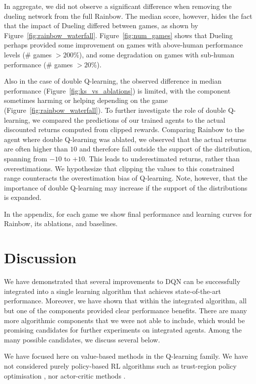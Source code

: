\documentclass[letterpaper]{article} %
\begin{document}
In aggregate, we did not observe a significant difference when removing the dueling network from the full Rainbow. The median score, however, hides the fact that the impact of Dueling differed between games, as shown by Figure~\ref{fig:rainbow_waterfall}. Figure~\ref{fig:num_games} shows that Dueling perhaps provided some improvement on games with above-human performance levels (\# games $> 200\%$), and some degradation on games with sub-human performance (\# games $> 20\%$). 

Also in the case of double Q-learning, the observed difference in median performance (Figure~\ref{fig:ks_vs_ablations}) is limited, with the component sometimes harming or helping depending on the game (Figure~\ref{fig:rainbow_waterfall}). To further investigate the role of double Q-learning, we compared the predictions of our trained agents to the actual discounted returns computed from clipped rewards. Comparing Rainbow to the agent where double Q-learning was ablated, we observed that the actual returns are often higher than $10$ and therefore fall outside the support of the distribution, spanning from $-10$ to $+10$.  This leads to underestimated returns, rather than overestimations.
We hypothesize that clipping the values to this constrained range counteracts the overestimation bias of Q-learning. Note, however, that the importance of double Q-learning may increase if the support of the distributions is expanded.

In the appendix, for each game we show final performance and learning curves for Rainbow, its ablations, and baselines.


\section{Discussion}

We have demonstrated that several improvements to DQN can be successfully integrated into a single learning algorithm that achieves state-of-the-art performance.  Moreover, we have shown that within the integrated algorithm, all but one of the components provided clear performance benefits.
There are many more algorithmic components that we were not able to include, which would be promising candidates for further experiments on integrated agents. Among the many possible candidates, we discuss several below.

We have focused here on value-based methods in the Q-learning family. We have not considered purely policy-based RL algorithms such as trust-region policy optimisation \cite{TRPO}, nor actor-critic methods \cite{Mnih:2016,ODonoghue2016PGQCP}. 
\end{document}
